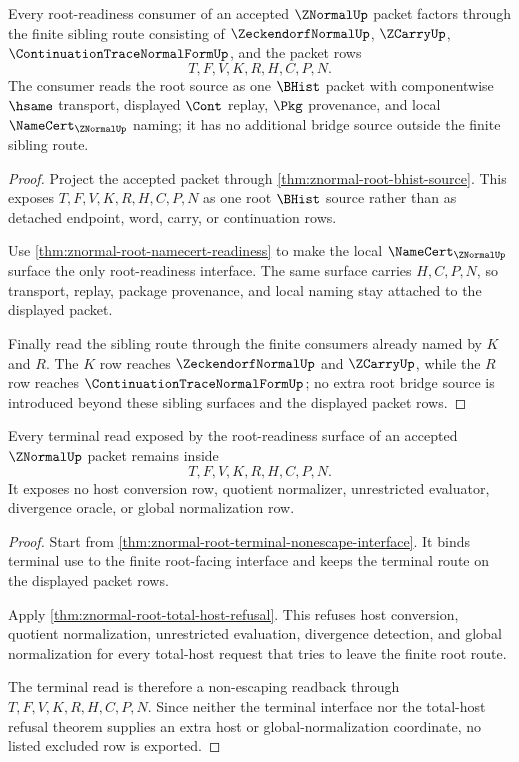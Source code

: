 \begin{theorem}
\label{thm:znormal-root-readiness-bridge-source}
Every root-readiness consumer of an accepted $\ZNormalUp$ packet factors through the finite sibling route consisting of $\ZeckendorfNormalUp$, $\ZCarryUp$, $\ContinuationTraceNormalFormUp$, and the packet rows
$$
T,F,V,K,R,H,C,P,N.
$$
The consumer reads the root source as one $\BHist$ packet with componentwise $\hsame$ transport, displayed $\Cont$ replay, $\Pkg$ provenance, and local $\NameCert_{\ZNormalUp}$ naming; it has no additional bridge source outside the finite sibling route.
\end{theorem}
\begin{proof}
Project the accepted packet through \autoref{thm:znormal-root-bhist-source}. This exposes $T,F,V,K,R,H,C,P,N$ as one root $\BHist$ source rather than as detached endpoint, word, carry, or continuation rows.

Use \autoref{thm:znormal-root-namecert-readiness} to make the local $\NameCert_{\ZNormalUp}$ surface the only root-readiness interface. The same surface carries $H,C,P,N$, so transport, replay, package provenance, and local naming stay attached to the displayed packet.

Finally read the sibling route through the finite consumers already named by $K$ and $R$. The $K$ row reaches $\ZeckendorfNormalUp$ and $\ZCarryUp$, while the $R$ row reaches $\ContinuationTraceNormalFormUp$; no extra root bridge source is introduced beyond these sibling surfaces and the displayed packet rows.
\end{proof}

\begin{theorem}
\label{thm:znormal-root-readiness-terminal-nonescape}
Every terminal read exposed by the root-readiness surface of an accepted $\ZNormalUp$ packet remains inside
$$
T,F,V,K,R,H,C,P,N.
$$
It exposes no host conversion row, quotient normalizer, unrestricted evaluator, divergence oracle, or global normalization row.
\end{theorem}
\begin{proof}
Start from \autoref{thm:znormal-root-terminal-nonescape-interface}. It binds terminal use to the finite root-facing interface and keeps the terminal route on the displayed packet rows.

Apply \autoref{thm:znormal-root-total-host-refusal}. This refuses host conversion, quotient normalization, unrestricted evaluation, divergence detection, and global normalization for every total-host request that tries to leave the finite root route.

The terminal read is therefore a non-escaping readback through $T,F,V,K,R,H,C,P,N$. Since neither the terminal interface nor the total-host refusal theorem supplies an extra host or global-normalization coordinate, no listed excluded row is exported.
\end{proof}

